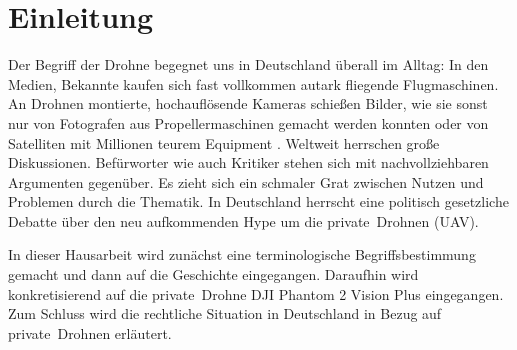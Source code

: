 \section{Einleitung}

Der Begriff der Drohne begegnet uns in Deutschland überall im Alltag: In den Medien, Bekannte kaufen sich fast vollkommen autark fliegende Flugmaschinen. An Drohnen montierte, hochauflösende Kameras schießen Bilder, wie sie sonst nur von Fotografen aus Propellermaschinen gemacht werden konnten oder von Satelliten mit Millionen teurem Equipment \cite{holzapfel}. Weltweit herrschen große Diskussionen. Befürworter wie auch Kritiker stehen sich mit nachvollziehbaren Argumenten gegenüber. Es zieht sich ein schmaler Grat zwischen Nutzen und Problemen durch die Thematik. In Deutschland herrscht eine politisch gesetzliche Debatte über den neu aufkommenden Hype um die \glqq private\grqq\ Drohnen (\ac{UAV})\cite{welchedrohne}. 

In dieser Hausarbeit wird zunächst eine terminologische Begriffsbestimmung gemacht und dann auf die Geschichte eingegangen. Daraufhin wird konkretisierend auf die \glqq private\grqq\ Drohne DJI Phantom 2 Vision Plus eingegangen. Zum Schluss wird die rechtliche Situation in Deutschland in Bezug auf  \glqq private\grqq\ Drohnen erläutert.

